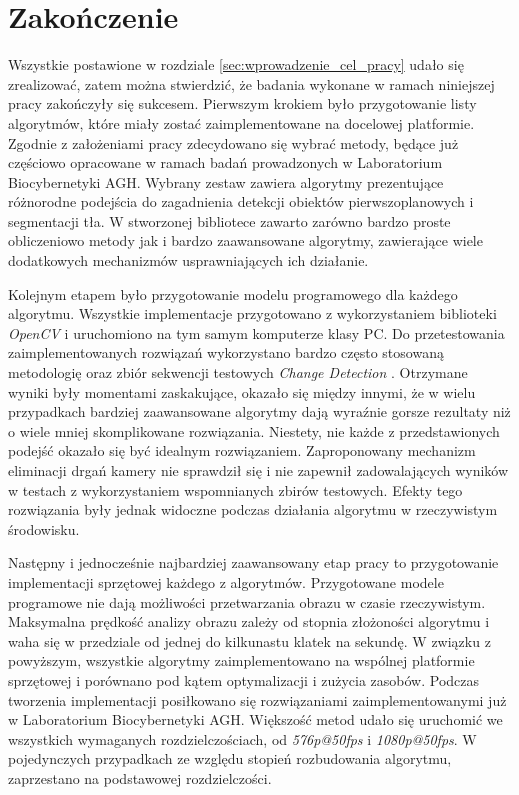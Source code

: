 \chapter{Zakończenie}
\label{cha:zakonczenie}

Wszystkie postawione w rozdziale \ref{sec:wprowadzenie_cel_pracy} udało się zrealizować, zatem można stwierdzić, że badania wykonane w ramach niniejszej pracy zakończyły się sukcesem. Pierwszym krokiem było przygotowanie listy algorytmów, które miały zostać zaimplementowane na docelowej platformie. Zgodnie z założeniami pracy zdecydowano się wybrać metody, będące już częściowo opracowane w ramach badań prowadzonych w Laboratorium Biocybernetyki AGH. Wybrany zestaw zawiera algorytmy prezentujące różnorodne podejścia do zagadnienia detekcji obiektów pierwszoplanowych i segmentacji tła. W stworzonej bibliotece zawarto zarówno bardzo proste obliczeniowo metody jak i bardzo zaawansowane algorytmy, zawierające wiele dodatkowych mechanizmów usprawniających ich działanie.

Kolejnym etapem było przygotowanie modelu programowego dla każdego algorytmu. Wszystkie implementacje przygotowano z wykorzystaniem biblioteki \textit{OpenCV} i uruchomiono na tym samym komputerze klasy PC. Do przetestowania zaimplementowanych rozwiązań wykorzystano bardzo często stosowaną metodologię \cite{} oraz zbiór sekwencji testowych \textit{Change Detection} \cite{}. Otrzymane wyniki były momentami zaskakujące, okazało się między innymi, że w wielu przypadkach bardziej zaawansowane algorytmy dają wyraźnie gorsze rezultaty niż o wiele mniej skomplikowane rozwiązania. Niestety, nie każde z przedstawionych podejść okazało się być idealnym rozwiązaniem. Zaproponowany mechanizm eliminacji drgań kamery nie sprawdził się i nie zapewnił zadowalających wyników w testach z wykorzystaniem wspomnianych zbirów testowych. Efekty tego rozwiązania były jednak widoczne podczas działania algorytmu w rzeczywistym środowisku. 

Następny i jednocześnie najbardziej zaawansowany etap pracy to przygotowanie implementacji sprzętowej każdego z algorytmów. Przygotowane modele programowe nie dają możliwości przetwarzania obrazu w czasie rzeczywistym. Maksymalna prędkość analizy obrazu zależy od stopnia złożoności algorytmu i waha się w przedziale od jednej do kilkunastu klatek na sekundę. W związku z powyższym, wszystkie algorytmy zaimplementowano na wspólnej platformie sprzętowej i porównano pod kątem optymalizacji i zużycia zasobów. Podczas tworzenia implementacji posiłkowano się rozwiązaniami zaimplementowanymi już w Laboratorium Biocybernetyki AGH. Większość metod udało się uruchomić we wszystkich wymaganych rozdzielczościach, od \textit{576p@50fps} i \textit{1080p@50fps}. W pojedynczych przypadkach ze względu stopień rozbudowania algorytmu, zaprzestano na podstawowej rozdzielczości.

